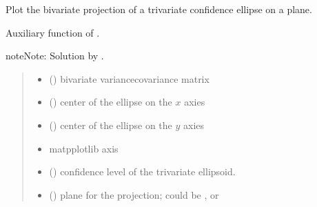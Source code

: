 \documentclass[letterpaper,10pt,english]{sphinxmanual}
\begin{document}
\begin{fulllineitems}
\label{\detokenize{cubmods:cubmods.general.conf_border}}
\pysigstartsignatures
{}
\pysigstopsignatures
\sphinxAtStartPar
Plot the bivariate projection of a trivariate confidence ellipse
on a plane.

\sphinxAtStartPar
Auxiliary function of .

\begin{sphinxadmonition}{note}{Note:}
\sphinxAtStartPar
Solution by .
\end{sphinxadmonition}
\begin{quote}\begin{description}
\begin{itemize}
\item {} 
\sphinxAtStartPar
{} () \textendash{} bivariate variance\sphinxhyphen{}covariance matrix

\item {} 
\sphinxAtStartPar
{} () \textendash{} center of the ellipse on the \(x\) axies

\item {} 
\sphinxAtStartPar
{} () \textendash{} center of the ellipse on the \(y\) axies

\item {} 
\sphinxAtStartPar
{} \textendash{} matpplotlib axis

\item {} 
\sphinxAtStartPar
{} () \textendash{} confidence level of the trivariate ellipsoid.

\item {} 
\sphinxAtStartPar
{} () \textendash{} plane for the projection; could be ,  or 


\end{itemize}
\end{description}
\end{quote}
\end{fulllineitems}
\end{document}
